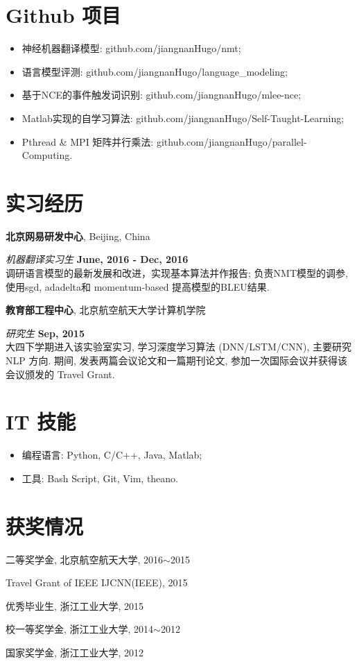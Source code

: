 \documentclass{resume}
\begin{document}
\section{ Github 项目}
\begin{itemize}
  \item {神经机器翻译模型:} github.com/jiangnanHugo/nmt;
  \item {语言模型评测:} github.com/jiangnanHugo/language\_modeling;
  \item {基于NCE的事件触发词识别:} github.com/jiangnanHugo/mlee-nce;
  \item {Matlab实现的自学习算法:} github.com/jiangnanHugo/Self-Taught-Learning;
  \item {Pthread \& MPI 矩阵并行乘法:} github.com/jiangnanHugo/parallel-Computing.
\end{itemize}

\section{实习经历 }
{\bf 北京网易研发中心}, Beijing, China

{\em 机器翻译实习生} \hfill {\bf June, 2016 - Dec, 2016}\\
调研语言模型的最新发展和改进，实现基本算法并作报告; 负责NMT模型的调参, 使用sgd, adadelta和 momentum-based 提高模型的BLEU结果.


{\bf 教育部工程中心}, 北京航空航天大学计算机学院

{\em 研究生} \hfill {\bf Sep, 2015 }\\
大四下学期进入该实验室实习, 学习深度学习算法 (DNN/LSTM/CNN), 主要研究 NLP 方向. 期间, 发表两篇会议论文和一篇期刊论文, 参加一次国际会议并获得该会议颁发的 Travel Grant.

\section{IT 技能}
\begin{itemize}
  \item 编程语言: Python, C/C++, Java, Matlab;
  \item 工具: Bash Script, Git, Vim, theano.
\end{itemize}

\section{获奖情况}
二等奖学金, 北京航空航天大学, 2016$\sim$2015

Travel Grant of IEEE IJCNN(IEEE), 2015

优秀毕业生, 浙江工业大学, 2015

校一等奖学金, 浙江工业大学, 2014$\sim$2012

国家奖学金, 浙江工业大学, 2012
\end{document}
